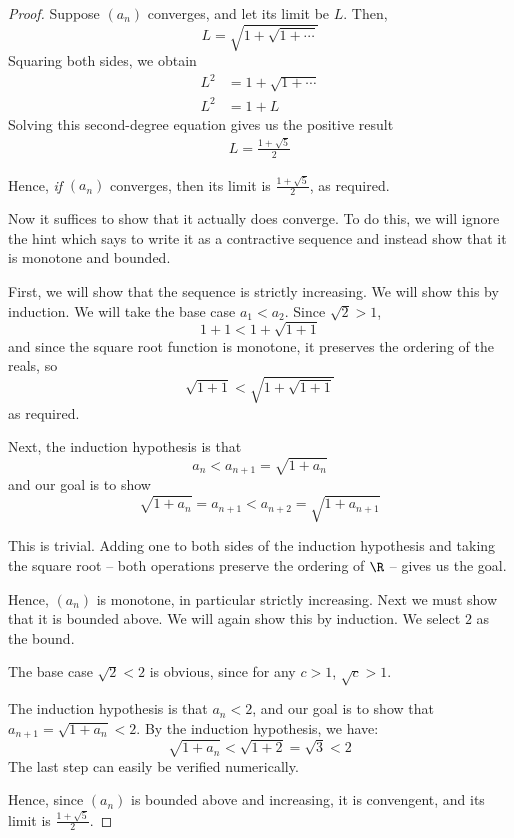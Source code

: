 \documentclass[11pt,letterpaper]{article}
\begin{document}
\begin{proof}
  Suppose $(a_n)$ converges, and let its limit be $L$. Then,
  \begin{equation*}
    L = \sqrt{1 + \sqrt{1 + \cdots}}
  \end{equation*}
  Squaring both sides, we obtain
  \begin{align*}
    L^2 &= 1 + \sqrt{1 + \cdots} \\
    L^2 &= 1 + L
  \end{align*}
  Solving this second-degree equation gives us the positive result
  \begin{align*}
    L = \frac{1 + \sqrt{5}}{2}
  \end{align*}

  Hence, \emph{if} $(a_n)$ converges, then its limit is
  $\frac{1 + \sqrt{5}}{2}$, as required.

  Now it suffices to show that it actually does converge. To do this, we will
  ignore the hint which says to write it as a contractive sequence and instead
  show that it is monotone and bounded.

  First, we will show that the sequence is strictly increasing. We will show
  this by induction. We will take the base case $a_1 < a_2$.
  Since $\sqrt{2} > 1$,
  \begin{equation*}
    1 + 1 < 1 + \sqrt{1 + 1}
  \end{equation*}
  and since the square root function is monotone, it preserves the ordering of
  the reals, so
  \begin{equation*}
    \sqrt{1 + 1} < \sqrt{1 + \sqrt{1 + 1}}
  \end{equation*}
  as required.

  Next, the induction hypothesis is that
  \begin{equation*}
    a_n < a_{n+1} = \sqrt{1 + a_n}
  \end{equation*}
  and our goal is to show
  \begin{equation*}
    \sqrt{1 + a_n} = a_{n+1} < a_{n+2} = \sqrt{1 + a_{n+1}}
  \end{equation*}

  This is trivial. Adding one to both sides of the induction hypothesis and
  taking the square root -- both operations preserve the ordering of $\R$ --
  gives us the goal.

  Hence, $(a_n)$ is monotone, in particular strictly increasing. Next we must
  show that it is bounded above. We will again show this by induction. We
  select $2$ as the bound.

  The base case $\sqrt{2} < 2$ is obvious, since for any $c > 1$,
  $\sqrt{c} > 1$.

  The induction hypothesis is that $a_n < 2$, and our goal is to show that
  $a_{n+1} = \sqrt{1 + a_n} < 2$. By the induction hypothesis, we have:
  \begin{equation*}
    \sqrt{1 + a_n} < \sqrt{1 + 2} = \sqrt{3} < 2
  \end{equation*}
  The last step can easily be verified numerically.

  Hence, since $(a_n)$ is bounded above and increasing, it is convengent, and
  its limit is $\frac{1 + \sqrt{5}}{2}$.
\end{proof}
\end{document}
